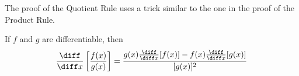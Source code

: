 \begin{frame}
The proof of the Quotient Rule uses a trick similar to the one in the proof of the Product Rule.  
\begin{theorem}
If $f$ and $g$ are differentiable, then
\[
\frac{\diff}{\diff x} \left[ \frac{f(x)}{g(x)}\right] = \frac{g(x)\frac{\diff}{\diff x} [f(x)] - f(x) \frac{\diff}{\diff x}[g(x)]}{[g(x)]^2}
\]
\end{theorem}
\end{frame}
